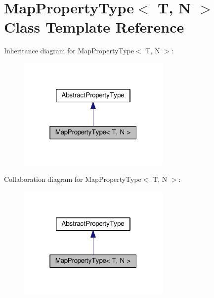 \hypertarget{classMapPropertyType}{\section{Map\+Property\+Type$<$ T, N $>$ Class Template Reference}
\label{classMapPropertyType}
}


Inheritance diagram for Map\+Property\+Type$<$ T, N $>$\+:\nopagebreak
\begin{figure}[H]
\begin{center}
\leavevmode
\includegraphics[width=211pt]{classMapPropertyType__inherit__graph}
\end{center}
\end{figure}


Collaboration diagram for Map\+Property\+Type$<$ T, N $>$\+:\nopagebreak
\begin{figure}[H]
\begin{center}
\leavevmode
\includegraphics[width=211pt]{classMapPropertyType__coll__graph}
\end{center}
\end{figure}
